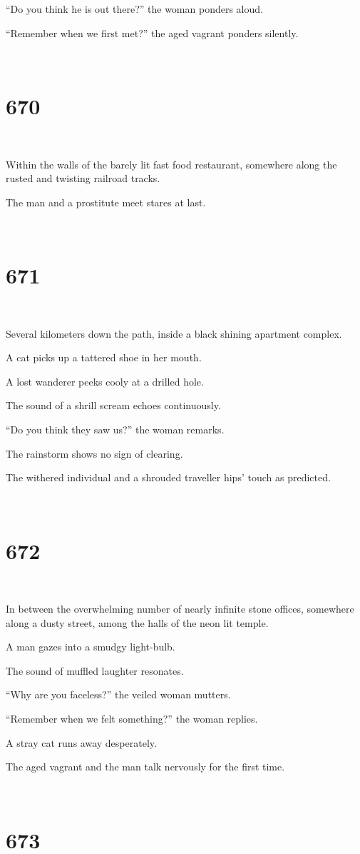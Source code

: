 \documentclass{report}
\begin{document}
``Do you think he is out there?'' the woman ponders aloud.

``Remember when we first met?'' the aged vagrant ponders silently.

~
\chapter*{670}
~

Within the walls of the barely lit fast food restaurant, somewhere along the rusted and twisting railroad tracks.

The man and a prostitute meet stares at last.

~
\chapter*{671}
~

Several kilometers down the path, inside a black shining apartment complex.

A cat picks up a tattered shoe in her mouth.

A lost wanderer peeks cooly at a drilled hole.

The sound of a shrill scream echoes continuously.

``Do you think they saw us?'' the woman remarks.

The rainstorm shows no sign of clearing.

The withered individual and a shrouded traveller hips' touch as predicted.

~
\chapter*{672}
~

In between the overwhelming number of nearly infinite stone offices, somewhere along a dusty street, among the halls of the neon lit temple.

A man gazes into a smudgy light-bulb.

The sound of muffled laughter resonates.

``Why are you faceless?'' the veiled woman mutters.

``Remember when we felt something?'' the woman replies.

A stray cat runs away desperately.

The aged vagrant and the man talk nervously for the first time.

~
\chapter*{673}
~
\end{document}

